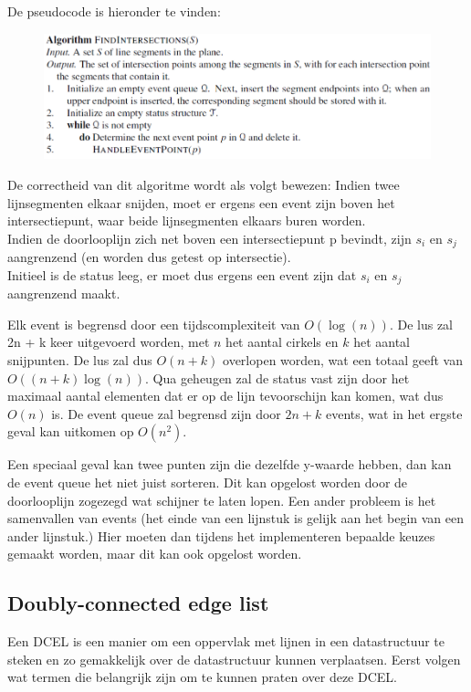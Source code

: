 \documentclass[12pt,a4paper]{article}
\begin{document}
	De pseudocode is hieronder te vinden: 
	
	\begin{figure}[h]
		\centering
		\includegraphics[width=0.9\linewidth]{afbeeldingen/find-intersections++}
		\label{fig:find-intersections++}
	\end{figure}
	
	De correctheid van dit algoritme wordt als volgt bewezen: Indien twee lijnsegmenten elkaar snijden, moet er ergens een event zijn boven het intersectiepunt, waar beide lijnsegmenten elkaars buren worden.\\
	Indien de doorlooplijn zich net boven een intersectiepunt p bevindt, zijn $s_i$ en $s_j$ aangrenzend (en worden dus getest op intersectie).\\
	Initieel is de status leeg, er moet dus ergens een event zijn dat $s_i$ en $s_j$ aangrenzend maakt.
	
	Elk event is begrensd door een tijdscomplexiteit van $O(\log(n))$. De lus zal 2n + k keer uitgevoerd worden, met $n$ het aantal cirkels en $k$ het aantal snijpunten. De lus zal dus  $O(n + k)$ overlopen worden, wat een totaal geeft van $O((n+k)\log(n))$. Qua geheugen zal de status vast zijn door het maximaal aantal elementen dat er op de lijn tevoorschijn kan komen, wat dus $O(n)$ is. De event queue zal begrensd zijn door $2n + k$ events, wat in het ergste geval kan uitkomen op $O(n^2)$. 
	
	Een speciaal geval kan twee punten zijn die dezelfde y-waarde hebben, dan kan de event queue het niet juist sorteren. Dit kan opgelost worden door de doorlooplijn zogezegd wat schijner te laten lopen. Een ander probleem is het samenvallen van events (het einde van een lijnstuk is gelijk aan het begin van een ander lijnstuk.) Hier moeten dan tijdens het implementeren bepaalde keuzes gemaakt worden, maar dit kan ook opgelost worden. %


	\subsection{Doubly-connected edge list}
	Een DCEL is een manier om een oppervlak met lijnen in een datastructuur te steken en zo gemakkelijk over de datastructuur kunnen verplaatsen. Eerst volgen wat termen die belangrijk zijn om te kunnen praten over deze DCEL. 
	
\end{document}
